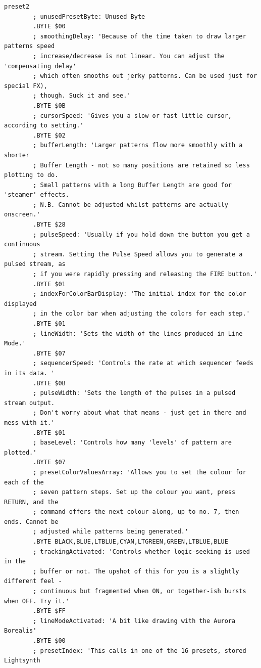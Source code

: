 \begin{lstlisting}[basicstyle=\ttfamily\tiny,caption=Source code for Preset 2.]
preset2
        ; unusedPresetByte: Unused Byte
        .BYTE $00
        ; smoothingDelay: 'Because of the time taken to draw larger patterns speed
        ; increase/decrease is not linear. You can adjust the 'compensating delay'
        ; which often smooths out jerky patterns. Can be used just for special FX),
        ; though. Suck it and see.'
        .BYTE $0B
        ; cursorSpeed: 'Gives you a slow or fast little cursor, according to setting.'
        .BYTE $02
        ; bufferLength: 'Larger patterns flow more smoothly with a shorter
        ; Buffer Length - not so many positions are retained so less plotting to do.
        ; Small patterns with a long Buffer Length are good for 'steamer' effects.
        ; N.B. Cannot be adjusted whilst patterns are actually onscreen.'
        .BYTE $28
        ; pulseSpeed: 'Usually if you hold down the button you get a continuous
        ; stream. Setting the Pulse Speed allows you to generate a pulsed stream, as
        ; if you were rapidly pressing and releasing the FIRE button.'
        .BYTE $01
        ; indexForColorBarDisplay: 'The initial index for the color displayed
        ; in the color bar when adjusting the colors for each step.'
        .BYTE $01
        ; lineWidth: 'Sets the width of the lines produced in Line Mode.'
        .BYTE $07
        ; sequencerSpeed: 'Controls the rate at which sequencer feeds in its data. '
        .BYTE $0B
        ; pulseWidth: 'Sets the length of the pulses in a pulsed stream output.
        ; Don't worry about what that means - just get in there and mess with it.'
        .BYTE $01
        ; baseLevel: 'Controls how many 'levels' of pattern are plotted.'
        .BYTE $07
        ; presetColorValuesArray: 'Allows you to set the colour for each of the
        ; seven pattern steps. Set up the colour you want, press RETURN, and the
        ; command offers the next colour along, up to no. 7, then ends. Cannot be
        ; adjusted while patterns being generated.'
        .BYTE BLACK,BLUE,LTBLUE,CYAN,LTGREEN,GREEN,LTBLUE,BLUE
        ; trackingActivated: 'Controls whether logic-seeking is used in the
        ; buffer or not. The upshot of this for you is a slightly different feel -
        ; continuous but fragmented when ON, or together-ish bursts when OFF. Try it.'
        .BYTE $FF
        ; lineModeActivated: 'A bit like drawing with the Aurora Borealis'
        .BYTE $00
        ; presetIndex: 'This calls in one of the 16 presets, stored Lightsynth

\end{lstlisting}

